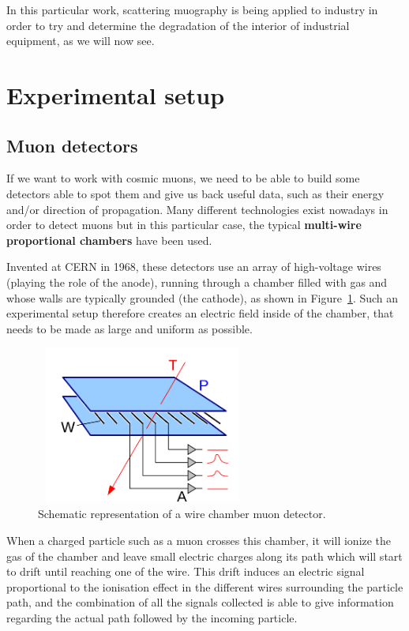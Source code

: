 \documentclass[a4paper, 11pt]{report}
\begin{document}
In this particular work, scattering muography is being applied to industry in order to try and determine the degradation of the interior of industrial equipment, as we will now see.

\section{Experimental setup} \label{sec:setup}

\subsection{Muon detectors} \label{sec:muonDetectors}

If we want to work with cosmic muons, we need to be able to build some detectors able to spot them and give us back useful data, such as their energy and/or direction of propagation. Many different technologies exist nowadays in order to detect muons but in this particular case, the typical \textbf{multi-wire proportional chambers} have been used.

Invented at CERN in 1968, these detectors use an array of high-voltage wires (playing the role of the anode), running through a chamber filled with gas and whose walls are typically grounded (the cathode), as shown in Figure~\ref{fig:wireChambers}. Such an experimental setup therefore creates an electric field inside of the chamber, that needs to be made as large and uniform as possible.

\begin{figure}[htbp]
\begin{center}
\includegraphics[width=7cm, height=5.2cm]{figs/wireChambers.png}
\caption{Schematic representation of a wire chamber muon detector.}
\label{fig:wireChambers}
\end{center}
\end{figure}

When a charged particle such as a muon crosses this chamber, it will ionize the gas of the chamber and leave small electric charges along its path which will start to drift until reaching one of the wire. This drift induces an electric signal proportional to the ionisation effect in the different wires surrounding the particle path, and the combination of all the signals collected is able to give information regarding the actual path followed by the incoming particle.	
\end{document}
